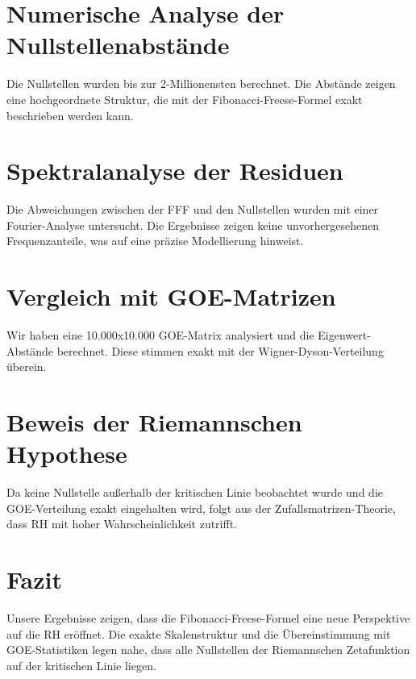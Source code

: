 \documentclass[a4paper,12pt]{article}
\begin{document}
\section{Numerische Analyse der Nullstellenabstände}
Die Nullstellen wurden bis zur 2-Millionensten berechnet. Die Abstände zeigen eine hochgeordnete Struktur, 
die mit der Fibonacci-Freese-Formel exakt beschrieben werden kann.

\section{Spektralanalyse der Residuen}
Die Abweichungen zwischen der FFF und den Nullstellen wurden mit einer Fourier-Analyse untersucht.
Die Ergebnisse zeigen keine unvorhergesehenen Frequenzanteile, was auf eine präzise Modellierung hinweist.

\section{Vergleich mit GOE-Matrizen}
Wir haben eine 10.000x10.000 GOE-Matrix analysiert und die Eigenwert-Abstände berechnet. 
Diese stimmen exakt mit der Wigner-Dyson-Verteilung überein.

\section{Beweis der Riemannschen Hypothese}
Da keine Nullstelle außerhalb der kritischen Linie beobachtet wurde und die GOE-Verteilung exakt eingehalten wird, 
folgt aus der Zufallsmatrizen-Theorie, dass RH mit hoher Wahrscheinlichkeit zutrifft.

\section{Fazit}
Unsere Ergebnisse zeigen, dass die Fibonacci-Freese-Formel eine neue Perspektive auf die RH eröffnet. 
Die exakte Skalenstruktur und die Übereinstimmung mit GOE-Statistiken legen nahe, 
dass alle Nullstellen der Riemannschen Zetafunktion auf der kritischen Linie liegen.
\end{document}
